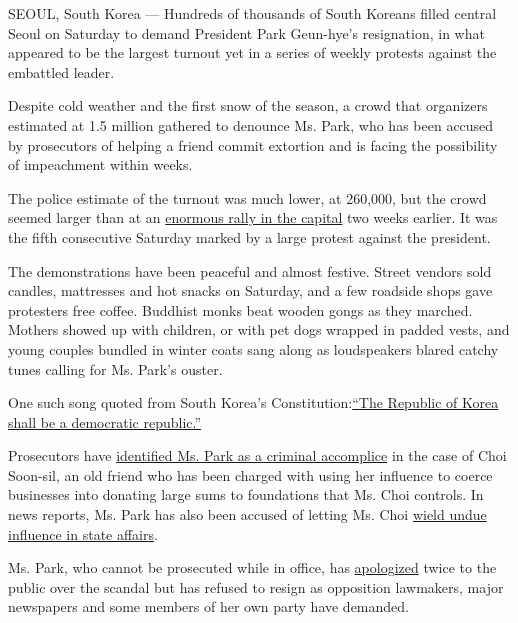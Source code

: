 SEOUL, South Korea --- Hundreds of thousands of South Koreans filled
central Seoul on Saturday to demand President Park Geun-hye's
resignation, in what appeared to be the largest turnout yet in a series
of weekly protests against the embattled leader.

Despite cold weather and the first snow of the season, a crowd that
organizers estimated at 1.5 million gathered to denounce Ms. Park, who
has been accused by prosecutors of helping a friend commit extortion and
is facing the possibility of impeachment within weeks.

The police estimate of the turnout was much lower, at 260,000, but the
crowd seemed larger than at an
\href{http://www.nytimes.com/2016/11/13/world/asia/korea-park-geun-hye-protests.html}{enormous
rally in the capital} two weeks earlier. It was the fifth consecutive
Saturday marked by a large protest against the president.

The demonstrations have been peaceful and almost festive. Street vendors
sold candles, mattresses and hot snacks on Saturday, and a few roadside
shops gave protesters free coffee. Buddhist monks beat wooden gongs as
they marched. Mothers showed up with children, or with pet dogs wrapped
in padded vests, and young couples bundled in winter coats sang along as
loudspeakers blared catchy tunes calling for Ms. Park's ouster.

One such song quoted from South Korea's
Constitution:\href{http://www.ilo.org/wcmsp5/groups/public/---ed_protect/---protrav/---ilo_aids/documents/legaldocument/wcms_117333.pdf}{``The
Republic of Korea shall be a democratic republic.''}

Prosecutors have
\href{http://www.nytimes.com/2016/11/20/world/asia/park-geun-hye-south-korea-extortion-accomplice-prosecutors.html}{identified
Ms. Park as a criminal accomplice} in the case of Choi Soon-sil, an old
friend who has been charged with using her influence to coerce
businesses into donating large sums to foundations that Ms. Choi
controls. In news reports, Ms. Park has also been accused of letting Ms.
Choi
\href{http://www.nytimes.com/2016/10/28/world/asia/south-korea-choi-soon-sil.html}{wield
undue influence in state affairs}.

Ms. Park, who cannot be prosecuted while in office, has
\href{http://www.nytimes.com/2016/11/04/world/asia/south-korea-park-geun-hye-investigation.html}{apologized}
twice to the public over the scandal but has refused to resign as
opposition lawmakers, major newspapers and some members of her own party
have demanded.

